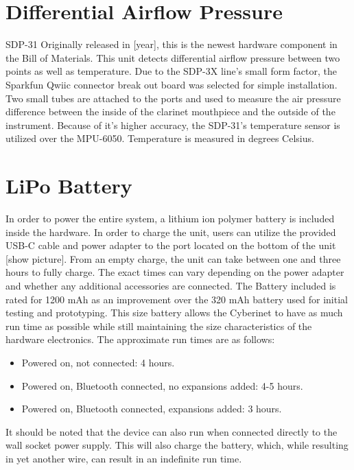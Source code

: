 \section{Differential Airflow Pressure}

SDP-31
Originally released in [year], this is the newest hardware component in the Bill of Materials. This unit detects differential airflow pressure between two points as well as temperature. Due to the SDP-3X line’s small form factor, the Sparkfun Qwiic connector break out board was selected for simple installation. Two small tubes are attached to the ports and used to measure the air pressure difference between the inside of the clarinet mouthpiece and the outside of the instrument.
Because of it’s higher accuracy, the SDP-31’s temperature sensor is utilized over the MPU-6050. Temperature is measured in degrees Celsius.

\section{LiPo Battery}
In order to power the entire system, a lithium ion polymer battery is included inside the hardware. In order to charge the unit, users can utilize the provided USB-C cable and power adapter to the port located on the bottom of the unit [show picture]. From an empty charge, the unit can take between one and three hours to fully charge. The exact times can vary depending on the power adapter and whether any additional accessories are connected. 
The Battery included is rated for 1200 mAh as an improvement over the 320 mAh battery used for initial testing and prototyping. This size battery allows the Cyberinet to have as much run time as possible while still maintaining the size characteristics of the hardware electronics. The approximate run times are as follows:

\begin{itemize}
    \item Powered on, not connected: 4 hours.
    \item Powered on, Bluetooth connected, no expansions added: 4-5 hours.
    \item Powered on, Bluetooth connected, expansions added: 3 hours.
\end{itemize}


It should be noted that the device can also run when connected directly to the wall socket power supply. This will also charge the battery, which, while resulting in yet another wire, can result in an indefinite run time.

